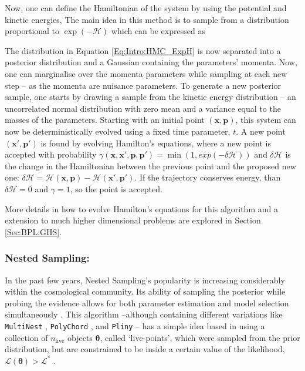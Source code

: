 \qquad Now, one can define the Hamiltonian of the system by using the potential and kinetic energies,
The main idea in this method is to sample from a distribution proportional to $\exp(-\mathcal{H})$ which can be expressed as

\qquad The distribution in Equation \eqref{Eq:Intro:HMC_ExpH} is now separated into a posterior distribution and a Gaussian containing the parameters' momenta. Now, one can marginalise over the momenta parameters while sampling at each new step -- as the momenta are nuisance parameters. To generate a new posterior sample, one starts by drawing a sample from the kinetic energy distribution -- an uncorrelated normal distribution with zero mean and a variance equal to the masses of the parameters. Starting with an initial point $(\bm{x}, \bm{p})$, this system can now be deterministically evolved using a fixed time parameter, $t$. A new point $(\bm{x}', \bm{p}')$ is found by evolving Hamilton's equations,
where a new point is accepted with probability $\gamma(\bm{x}, \bm{x}', \bm{p}, \bm{p}') = \min(1, exp(-\delta\mathcal{H}))$ and $\delta\mathcal{H}$ is the change in the Hamiltonian between the previous point and the proposed new one: $\delta\mathcal{H} = \mathcal{H}(\bm{x}, \bm{p}) - \mathcal{H}(\bm{x}', \bm{p}')$. If the trajectory conserves energy, than $\delta\mathcal{H} = 0$ and $\gamma =1$, so the point is accepted. 

\qquad More details in how to evolve Hamilton's equations for this algorithm and a extension to much higher dimensional problems are explored in Section \ref{Sec:BPL:GHS}.

\subsubsection{Nested Sampling:}
In the past few years, Nested Sampling's popularity is increasing considerably within the cosmological community. Its ability of sampling the posterior while probing the evidence allows for both parameter estimation and model selection simultaneously \citep{2004NestedSampling}. This algorithm --although containing different variations like \texttt{MultiNest} \citep{2009Multinest}, \texttt{PolyChord} \citep{2015PolyChord}, and \texttt{Pliny} \citep{PlinyRichardThesis} -- has a simple idea based in using a collection of $n_{\text{live}}$ objects $\bm{\theta}$, called `live-points', which were sampled from the prior distribution, but are constrained to be inside a certain value of the likelihood, $\mathcal{L}(\bm{\theta}) > \mathcal{L}^*$ \citep{sivia2006data}.

